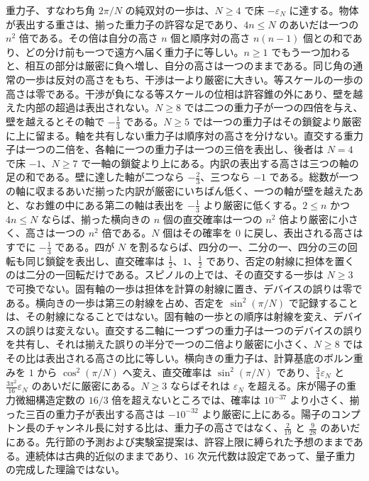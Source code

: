 \documentclass[a4paper]{article}
\begin{document}
重力子、すなわち角 \(2\pi/N\) の純双対の一歩は、\(N\ge 4\) で床 \(-\varepsilon_N\) に達する。物体が表出する重さは、揃った重力子の許容な足であり、\(4n\le N\) のあいだは一つの \(n^2\) 倍である。その倍は自分の高さ \(n\) 個と順序対の高さ \(n(n-1)\) 個との和であり、どの分け前も一つで遠方へ届く重力子に等しい。\(n\ge 1\) でもう一つ加わると、相互の部分は厳密に負へ増し、自分の高さは一つのままである。同じ角の通常の一歩は反対の高さをもち、干渉は一より厳密に大きい。等スケールの一歩の高さは零である。干渉が負になる等スケールの位相は許容錐の外にあり、壁を越えた内部の超過は表出されない。\(N\ge 8\) では二つの重力子が一つの四倍を与え、壁を越えるとその軸で \(-\frac13\) である。\(N\ge 5\) では一つの重力子はその鎖錠より厳密に上に留まる。軸を共有しない重力子は順序対の高さを分けない。直交する重力子は一つの二倍を、各軸に一つの重力子は一つの三倍を表出し、後者は \(N=4\) で床 \(-1\)、\(N\ge 7\) で一軸の鎖錠より上にある。内訳の表出する高さは三つの軸の足の和である。壁に達した軸が二つなら \(-\frac23\)、三つなら \(-1\) である。総数が一つの軸に収まるあいだ揃った内訳が厳密にいちばん低く、一つの軸が壁を越えたあと、なお錐の中にある第二の軸は表出を \(-\frac13\) より厳密に低くする。\(2\le n\) かつ \(4n\le N\) ならば、揃った横向きの \(n\) 個の直交確率は一つの \(n^2\) 倍より厳密に小さく、高さは一つの \(n^2\) 倍である。\(N\) 個はその確率を \(0\) に戻し、表出される高さはすでに \(-\frac13\) である。四が \(N\) を割るならば、四分の一、二分の一、四分の三の回転も同じ鎖錠を表出し、直交確率は \(\frac12\)、\(1\)、\(\frac12\) であり、否定の射線に担体を置くのは二分の一回転だけである。スピノルの上では、その直交する一歩は \(N\ge 3\) で可換でない。固有軸の一歩は担体を計算の射線に置き、デバイスの誤りは零である。横向きの一歩は第三の射線を占め、否定を \(\sin^2(\pi/N)\) で記録することは、その射線になることではない。固有軸の一歩との順序は射線を変え、デバイスの誤りは変えない。直交する二軸に一つずつの重力子は一つのデバイスの誤りを共有し、それは揃えた誤りの半分で一つの二倍より厳密に小さく、\(N\ge 8\) ではその比は表出される高さの比に等しい。横向きの重力子は、計算基底のボルン重みを \(1\) から \(\cos^2(\pi/N)\) へ変え、直交確率は \(\sin^2(\pi/N)\) であり、\(\tfrac34\varepsilon_N\) と \(\tfrac{3\pi^2}{16}\varepsilon_N\) のあいだに厳密にある。\(N\ge 3\) ならばそれは \(\varepsilon_N\) を超える。床が陽子の重力微細構造定数の \(16/3\) 倍を超えないところでは、確率は \(10^{-37}\) より小さく、揃った三百の重力子が表出する高さは \(-10^{-32}\) より厳密に上にある。陽子のコンプトン長のチャンネル長に対する比は、重力子の高さではなく、\(\tfrac{2}{19}\) と \(\tfrac{9}{28}\) のあいだにある。先行節の予測および実験室提案は、許容上限に縛られた予想のままである。連続体は古典的近似のままであり、$16$ 次元代数は設定であって、量子重力の完成した理論ではない。
\end{document}
